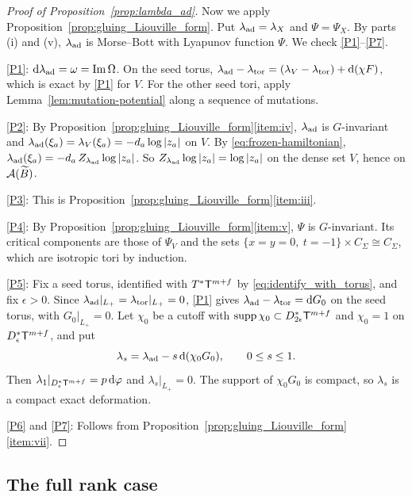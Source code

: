 \documentclass[12pt, letter]{amsart}
\theoremstyle{definition}
\begin{document}
\begin{proof}[Proof of Proposition~\ref{prop:lambda_ad}]
Now we apply Proposition~\ref{prop:gluing_Liouville_form}. 
Put $\lambda_{\mathrm{ad}}=\lambda_X$ and $\Psi=\Psi_X$. 
By parts (i) and (v), $\lambda_{\mathrm{ad}}$ is Morse--Bott with Lyapunov function $\Psi$.
We check \ref{P1}--\ref{P7}.

\ref{P1}: $\mathrm{d}\lambda_{\mathrm{ad}}=\omega=\operatorname{Im}\Omega$.
On the seed torus, $\lambda_{\mathrm{ad}}-\lambda_{\mathrm{tor}}=(\lambda_V-\lambda_{\mathrm{tor}})+\mathrm{d}(\chi F)$, which is exact by \ref{P1} for $V$.
For the other seed tori, apply Lemma~\ref{lem:mutation-potential} along a sequence of mutations.

\ref{P2}: By Proposition~\ref{prop:gluing_Liouville_form}\ref{item:iv}, $\lambda_{\mathrm{ad}}$ is $G$-invariant and $\lambda_{\mathrm{ad}}(\xi_a)=\lambda_V(\xi_a)=-d_a\log|z_a|$ on $V$.
By \eqref{eq:frozen-hamiltonian}, $\lambda_{\mathrm{ad}}(\xi_a)=-d_a\,Z_{\lambda_{\mathrm{ad}}}\log|z_a|$.
So $Z_{\lambda_{\mathrm{ad}}}\log|z_a|=\log|z_a|$ on the dense set $V$, hence on $\mathcal{A}(\widetilde B)$.

\ref{P3}: This is Proposition~\ref{prop:gluing_Liouville_form}\ref{item:iii}.

\ref{P4}: By Proposition~\ref{prop:gluing_Liouville_form}\ref{item:v}, $\Psi$ is $G$-invariant.
Its critical components are those of $\Psi_V$ and the sets $\{x=y=0,\ t=-1\}\times C_\Sigma\cong C_\Sigma$, which are isotropic tori by induction.

\ref{P5}: Fix a seed torus, identified with $T^*\mathsf T^{m+f}$ by \eqref{eq:identify_with_torus}, and fix $\epsilon>0$.
Since $\lambda_{\mathrm{ad}}|_{L_+}=\lambda_{\mathrm{tor}}|_{L_+}=0$, \ref{P1} gives $\lambda_{\mathrm{ad}}-\lambda_{\mathrm{tor}}=\mathrm{d} G_0$ on the seed torus, with $G_0|_{L_+}=0$.
Let $\chi_0$ be a cutoff with $\operatorname{supp}\chi_0\subset D^*_{2\epsilon}\mathsf T^{m+f}$ and $\chi_0=1$ on $D^*_\epsilon\mathsf T^{m+f}$, and put
\[
 \lambda_s=\lambda_{\mathrm{ad}}-s\,\mathrm{d}(\chi_0G_0),\qquad0\le s\le1 .
\]
Then $\lambda_1|_{D^*_\epsilon\mathsf T^{m+f}}=p\,\mathrm{d}\varphi$ and $\lambda_s|_{L_+}=0$.
The support of $\chi_0G_0$ is compact, so $\lambda_s$ is a compact exact deformation.

\ref{P6} and
\ref{P7}: Follows from Proposition~\ref{prop:gluing_Liouville_form}\ref{item:vii}. 
\end{proof}






















\subsection{The full rank case}\label{sec:fullrank-geometry}
\end{document}
